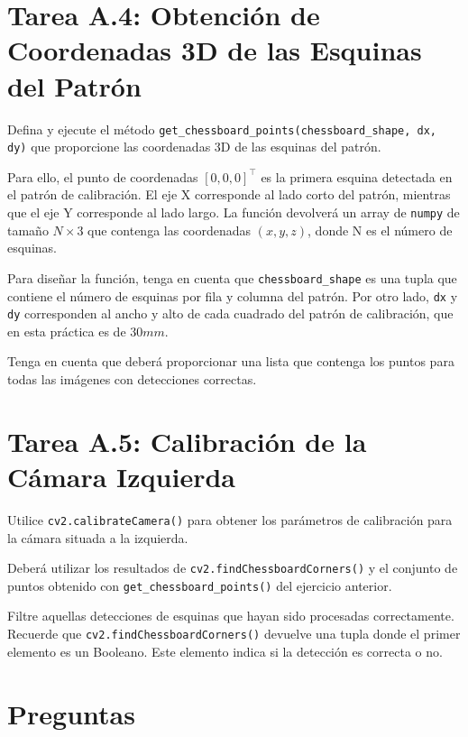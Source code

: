 \section*{Tarea A.4: Obtención de Coordenadas 3D de las Esquinas del Patrón}
Defina y ejecute el método \texttt{get\_chessboard\_points(chessboard\_shape, dx, dy)} que proporcione las coordenadas 3D de las esquinas del patrón.

Para ello, el punto de coordenadas $[0, 0, 0]^\top$ es la primera esquina detectada en el patrón de calibración. El eje X corresponde al lado corto del patrón, mientras que el eje Y corresponde al lado largo. La función devolverá un array de \texttt{numpy} de tamaño $ N \times 3 $ que contenga las coordenadas $(x, y, z)$, donde N es el número de esquinas.

Para diseñar la función, tenga en cuenta que \texttt{chessboard\_shape} es una tupla que contiene el número de esquinas por fila y columna del patrón. Por otro lado, \texttt{dx} y \texttt{dy} corresponden al ancho y alto de cada cuadrado del patrón de calibración, que en esta práctica es de $30mm$.

Tenga en cuenta que deberá proporcionar una lista que contenga los puntos para todas las imágenes con detecciones correctas.


\section*{Tarea A.5: Calibración de la Cámara Izquierda}
Utilice \texttt{cv2.calibrateCamera()} para obtener los parámetros de calibración para la cámara situada a la izquierda.

Deberá utilizar los resultados de \texttt{cv2.findChessboardCorners()} y el conjunto de puntos obtenido con \texttt{get\_chessboard\_points()} del ejercicio anterior.

Filtre aquellas detecciones de esquinas que hayan sido procesadas correctamente. Recuerde que \texttt{cv2.findChessboardCorners()} devuelve una tupla donde el primer elemento es un Booleano. Este elemento indica si la detección es correcta o no.


\newpage
\section*{Preguntas}

